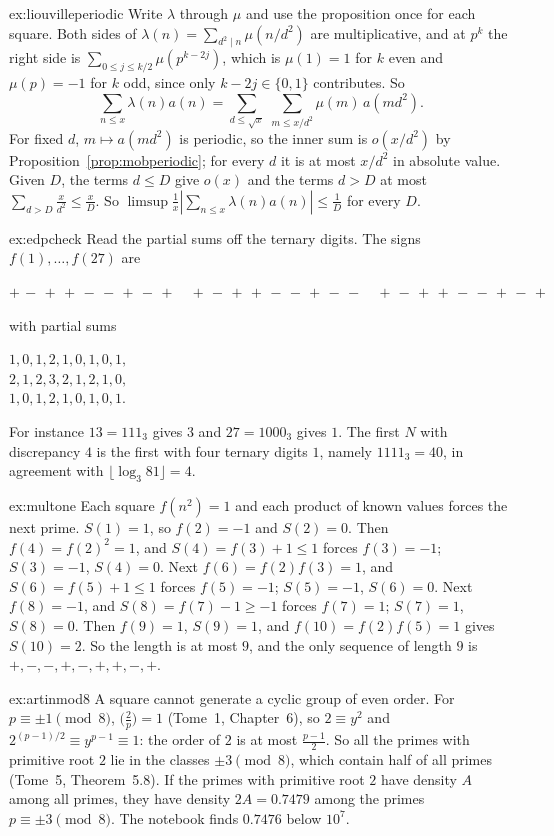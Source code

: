 \begin{solution}{ex:liouvilleperiodic}
\idea Write $\lambda$ through $\mu$ and use the proposition once for each square.
\writeup Both sides of $\lambda(n)=\sum_{d^2\mid n}\mu(n/d^2)$ are multiplicative, and at $p^k$ the right side is $\sum_{0\le j\le k/2}\mu(p^{k-2j})$, which is
$\mu(1)=1$ for $k$ even and $\mu(p)=-1$ for $k$ odd, since only $k-2j\in\{0,1\}$ contributes. So
\[
\sum_{n\le x}\lambda(n)a(n)=\sum_{d\le\sqrt x}\ \sum_{m\le x/d^2}\mu(m)\,a(md^2).
\]
For fixed $d$, $m\mapsto a(md^2)$ is periodic, so the inner sum is $o(x/d^2)$ by Proposition~\ref{prop:mobperiodic}; for every $d$ it is at most $x/d^2$ in absolute value.
Given $D$, the terms $d\le D$ give $o(x)$ and the terms $d>D$ at most $\sum_{d>D}\frac x{d^2}\le\frac xD$. So $\limsup\frac1x|\sum_{n\le x}\lambda(n)a(n)|\le\frac1D$ for every
$D$.
\end{solution}

\begin{solution}{ex:edpcheck}
\idea Read the partial sums off the ternary digits.
\writeup The signs $f(1),\dots,f(27)$ are
\begin{center}
$+\,-\,+\,+\,-\,-\,+\,-\,+\quad+\,-\,+\,+\,-\,-\,+\,-\,-\quad+\,-\,+\,+\,-\,-\,+\,-\,+$
\end{center}
with partial sums
\begin{center}
$1,0,1,2,1,0,1,0,1,$\\
$2,1,2,3,2,1,2,1,0,$\\
$1,0,1,2,1,0,1,0,1.$
\end{center} For instance $13=111_3$ gives $3$ and $27=1000_3$ gives $1$. The first $N$ with discrepancy $4$ is the first
with four ternary digits $1$, namely $1111_3=40$, in agreement with $\lfloor\log_3 81\rfloor=4$.
\end{solution}

\begin{solution}{ex:multone}
\idea Each square $f(n^2)=1$ and each product of known values forces the next prime.
\writeup $S(1)=1$, so $f(2)=-1$ and $S(2)=0$. Then $f(4)=f(2)^2=1$, and $S(4)=f(3)+1\le1$ forces $f(3)=-1$; $S(3)=-1$, $S(4)=0$. Next $f(6)=f(2)f(3)=1$, and
$S(6)=f(5)+1\le1$ forces $f(5)=-1$; $S(5)=-1$, $S(6)=0$. Next $f(8)=-1$, and $S(8)=f(7)-1\ge-1$ forces $f(7)=1$; $S(7)=1$, $S(8)=0$. Then $f(9)=1$, $S(9)=1$, and
$f(10)=f(2)f(5)=1$ gives $S(10)=2$. So the length is at most $9$, and the only sequence of length $9$ is $+,-,-,+,-,+,+,-,+$.
\end{solution}

\begin{solution}{ex:artinmod8}
\idea A square cannot generate a cyclic group of even order.
\writeup For $p\equiv\pm1\pmod8$, $\bigl(\frac2p\bigr)=1$ (Tome~1, Chapter~6), so $2\equiv y^2$ and $2^{(p-1)/2}\equiv y^{p-1}\equiv1$: the order of $2$ is at most
$\frac{p-1}2$. So all the primes with primitive root $2$ lie in the classes $\pm3\pmod8$, which contain half of all primes (Tome~5, Theorem~5.8). If the
primes with primitive root $2$ have density $A$ among all primes, they have density $2A=0.7479$ among the primes $p\equiv\pm3\pmod8$. The notebook finds
$0.7476$ below $10^7$.
\end{solution}

